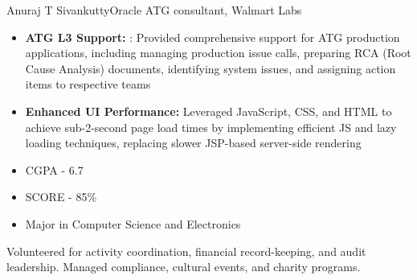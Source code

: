 \documentclass{article}
\begin{document}
\begin{cv}{Anuraj T Sivankutty}{Oracle ATG consultant, Walmart Labs}
\begin{cvevent}[August - 2017][September - 2018]
\begin{itemize}
        \item \textbf{ATG L3 Support: }: Provided comprehensive support for ATG production applications, including managing production issue calls, preparing RCA (Root Cause Analysis) documents, identifying system issues, and assigning action items to respective teams
    
        \item  \textbf{Enhanced UI Performance:} Leveraged JavaScript, CSS, and HTML to achieve sub-2-second page load times by implementing efficient JS and lazy loading techniques, replacing slower JSP-based server-side rendering
        
    \end{itemize}
\end{cvevent}




\begin{cvevent}[June-2012][May-2016]
    \begin{itemize}
        \item CGPA - 6.7
    \end{itemize}
\end{cvevent}

\begin{cvevent}[June-2010][May-2012]
    \begin{itemize}
        \item SCORE - 85\%
        \item Major in Computer Science and Electronics
    \end{itemize}
\end{cvevent}



\begin{cvevent}[2019][Present]
    Volunteered for activity coordination, financial record-keeping, and audit leadership. Managed compliance, cultural events, and charity programs.
\end{cvevent}


\end{cv}
\end{document}
